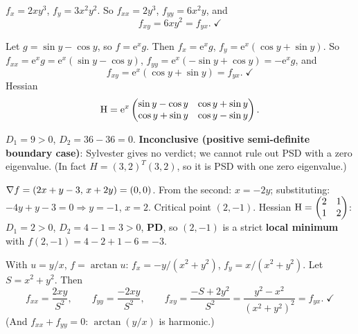 \begin{solutions}
  \item $f_x = 2xy^{3}$, $f_y = 3x^{2}y^{2}$. So $f_{xx} = 2y^{3}$,
        $f_{yy} = 6x^{2}y$, and
        \[
          f_{xy} = 6xy^{2} = f_{yx} . \; \checkmark
        \]

  \item Let $g=\sin y-\cos y$, so $f=\mathrm{e}^{x}g$. Then
        $f_x = \mathrm{e}^{x}g$, $f_y = \mathrm{e}^{x}(\cos y+\sin y)$. So
        $f_{xx} = \mathrm{e}^{x}g = \mathrm{e}^{x}(\sin y-\cos y)$,
        $f_{yy} = \mathrm{e}^{x}(-\sin y+\cos y) = -\mathrm{e}^{x}g$, and
        \[
          f_{xy} = \mathrm{e}^{x}(\cos y+\sin y) = f_{yx} . \; \checkmark
        \]
        Hessian
        \[
          \operatorname{H} = \mathrm{e}^{x}
          \begin{pmatrix}
            \sin y-\cos y & \cos y+\sin y \\
            \cos y+\sin y & \cos y-\sin y
          \end{pmatrix} .
        \]

  \item $D_1 = 9 > 0$, $D_2 = 36 - 36 = 0$. \textbf{Inconclusive
        (positive semi-definite boundary case)}: Sylvester gives no
        verdict; we cannot rule out PSD with a zero eigenvalue. (In fact
        $H = (3,2)^{T}(3,2)$, so it is PSD with one zero eigenvalue.)

  \item $\nabla f = (2x+y-3,\,x+2y) = (0,0)$. From the second: $x=-2y$;
        substituting: $-4y+y-3=0 \Rightarrow y=-1$, $x=2$. Critical point
        $(2,-1)$. Hessian $\operatorname{H} = \begin{pmatrix}2&1\\1&2\end{pmatrix}$:
        $D_1=2>0$, $D_2=4-1=3>0$, \textbf{PD}, so $(2,-1)$ is a strict
        \textbf{local minimum} with $f(2,-1) = 4-2+1-6 = -3$.

  \item With $u=y/x$, $f=\arctan u$: $f_x = -y/(x^{2}+y^{2})$,
        $f_y = x/(x^{2}+y^{2})$. Let $S=x^{2}+y^{2}$. Then
        \[
          f_{xx} = \frac{2xy}{S^{2}}, \qquad
          f_{yy} = \frac{-2xy}{S^{2}}, \qquad
          f_{xy} = \frac{-S+2y^{2}}{S^{2}} = \frac{y^{2}-x^{2}}{(x^{2}+y^{2})^{2}}
                  = f_{yx} . \; \checkmark
        \]
        (And $f_{xx}+f_{yy}=0$: $\arctan(y/x)$ is harmonic.)


\end{solutions}
